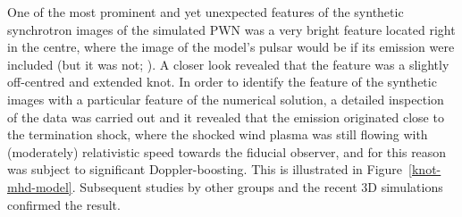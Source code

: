 One of the most prominent and yet unexpected features of the synthetic synchrotron images of the simulated PWN was a very bright feature located right in the centre, where the image of the model’s pulsar would be if its emission were included (but it was not; \citet{ssk-lyub-03,ssk-lyub-04}).  A closer look revealed that the feature was a slightly off-centred and extended knot.  In order to identify the feature of the synthetic images with a particular feature of the numerical solution,  a detailed inspection of the data was carried out and it revealed that the emission originated close to the termination shock, where the shocked wind plasma was still flowing with  (moderately) relativistic speed towards the fiducial observer,  and for this reason was subject to significant Doppler-boosting.  This is illustrated in Figure~\ref{knot-mhd-model}. Subsequent  studies by other groups \cite{delzanna-06} and  the recent 3D simulations \citep{porth-13,porth-14} confirmed the result.    